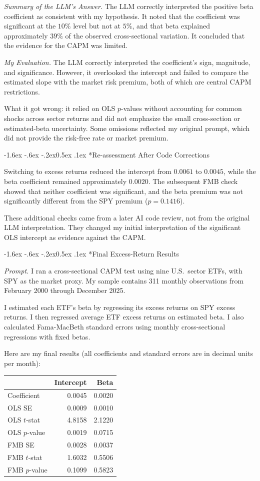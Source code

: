 \documentclass[11pt]{article}
\makeatletter
\renewcommand\subparagraph{\@startsection{subparagraph}{5}{0pt}%
  {-1.6ex \@plus -.6ex \@minus -.2ex}{0.5ex \@plus .1ex}%
  {\normalfont\itshape\normalsize\color{psink}}}
\makeatother
\begin{document}
\smallskip\noindent\textit{Summary of the LLM's Answer.} The LLM correctly interpreted the
positive beta coefficient as consistent with my hypothesis. It noted that the
coefficient was significant at the $10\%$ level but not at $5\%$, and that beta
explained approximately $39\%$ of the observed cross-sectional variation. It
concluded that the evidence for the CAPM was limited.

\smallskip\noindent\textit{My Evaluation.} The LLM correctly interpreted the coefficient's
sign, magnitude, and significance. However, it overlooked the intercept and
failed to compare the estimated slope with the market risk premium, both of
which are central CAPM restrictions.

What it got wrong: it relied on OLS $p$-values without accounting for common
shocks across sector returns and did not emphasize the small cross-section or
estimated-beta uncertainty. Some omissions reflected my original prompt, which
did not provide the risk-free rate or market premium.

\subparagraph*{Re-assessment After Code Corrections}

Switching to excess returns reduced the intercept from $0.0061$ to $0.0045$,
while the beta coefficient remained approximately $0.0020$. The subsequent FMB
check showed that neither coefficient was significant, and the beta premium was
not significantly different from the SPY premium ($p = 0.1416$).

These additional checks came from a later AI code review, not from the original
LLM interpretation. They changed my initial interpretation of the significant
OLS intercept as evidence against the CAPM.

\subparagraph*{Final Excess-Return Results}

\smallskip\noindent\textit{Prompt.} I ran a cross-sectional CAPM test using nine U.S.\ sector
ETFs, with SPY as the market proxy. My sample contains 311 monthly observations
from February 2000 through December 2025.

I estimated each ETF's beta by regressing its excess returns on SPY excess
returns. I then regressed average ETF excess returns on estimated beta. I also
calculated Fama-MacBeth standard errors using monthly cross-sectional
regressions with fixed betas.

Here are my final results (all coefficients and standard errors are in decimal
units per month):

\begin{center}
\small
\begin{tabular}{lrr}
\toprule
& Intercept & Beta \\
\midrule
Coefficient & 0.0045 & 0.0020 \\
OLS SE & 0.0009 & 0.0010 \\
OLS $t$-stat & 4.8158 & 2.1220 \\
OLS $p$-value & 0.0019 & 0.0715 \\
FMB SE & 0.0028 & 0.0037 \\
FMB $t$-stat & 1.6032 & 0.5506 \\
FMB $p$-value & 0.1099 & 0.5823 \\
\bottomrule
\end{tabular}
\end{center}
\end{document}
